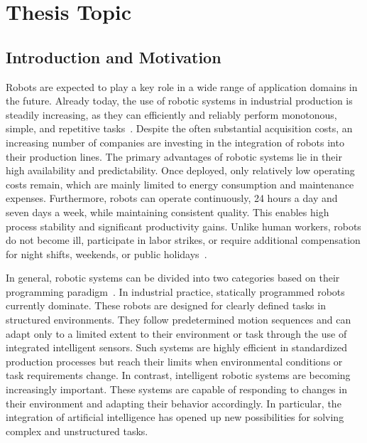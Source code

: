 \chapter{Thesis Topic}

\section{Introduction and Motivation}
Robots are expected to play a key role in a wide range of application domains in the future. Already today, the use of robotic systems in industrial production is steadily increasing, as they can efficiently and reliably perform monotonous, simple, and repetitive tasks~\cite{roboticsWorldRobotics2025}. Despite the often substantial acquisition costs, an increasing number of companies are investing in the integration of robots into their production lines.
The primary advantages of robotic systems lie in their high availability and predictability. Once deployed, only relatively low operating costs remain, which are mainly limited to energy consumption and maintenance expenses. Furthermore, robots can operate continuously, 24 hours a day and seven days a week, while maintaining consistent quality. This enables high process stability and significant productivity gains. Unlike human workers, robots do not become ill, participate in labor strikes, or require additional compensation for night shifts, weekends, or public holidays~\cite{robotsWhatAreIndustrial2024}.

In general, robotic systems can be divided into two categories based on their programming paradigm~\cite{sicilianoSpringerHandbookRobotics2016}. In industrial practice, statically programmed robots currently dominate. These robots are designed for clearly defined tasks in structured environments. They follow predetermined motion sequences and can adapt only to a limited extent to their environment or task through the use of integrated intelligent sensors. Such systems are highly efficient in standardized production processes but reach their limits when environmental conditions or task requirements change.
In contrast, intelligent robotic systems are becoming increasingly important. These systems are capable of responding to changes in their environment and adapting their behavior accordingly. In particular, the integration of artificial intelligence has opened up new possibilities for solving complex and unstructured tasks.

